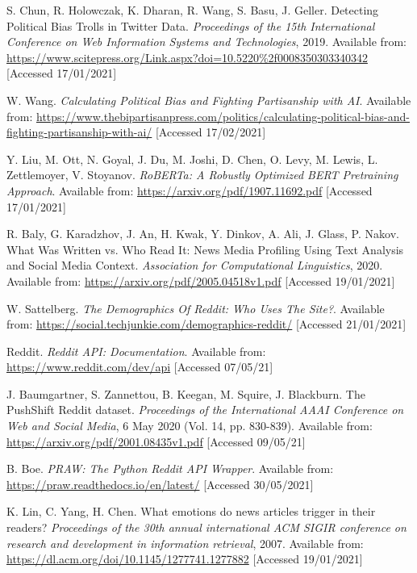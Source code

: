 \begin{thebibliography}{9}
S. Chun, R. Holowczak, K. Dharan, R. Wang, S. Basu, J. Geller. Detecting Political Bias Trolls in Twitter Data. \textit{Proceedings of the 15th International Conference on Web Information Systems and Technologies}, 2019. Available from: \url{https://www.scitepress.org/Link.aspx?doi=10.5220\%2f0008350303340342} [Accessed 17/01/2021]

W. Wang. \textit{Calculating Political Bias and Fighting Partisanship with AI}. Available from: \url{https://www.thebipartisanpress.com/politics/calculating-political-bias-and-fighting-partisanship-with-ai/} [Accessed 17/02/2021]

Y. Liu, M. Ott, N. Goyal, J. Du, M. Joshi, D. Chen, O. Levy, M. Lewis, L. Zettlemoyer, V. Stoyanov. \textit{RoBERTa: A Robustly Optimized BERT Pretraining Approach}. Available from: \url{https://arxiv.org/pdf/1907.11692.pdf} [Accessed 17/01/2021]

R. Baly, G. Karadzhov, J. An, H. Kwak, Y. Dinkov, A. Ali, J. Glass, P. Nakov. What Was Written vs. Who Read It:
News Media Profiling Using Text Analysis and Social Media Context. \textit{Association for Computational Linguistics}, 2020. Available from: \url{https://arxiv.org/pdf/2005.04518v1.pdf} [Accessed 19/01/2021]

W. Sattelberg. \textit{The Demographics Of Reddit: Who Uses The Site?}. Available from: \url{https://social.techjunkie.com/demographics-reddit/} [Accessed 21/01/2021]

Reddit. \textit{Reddit API: Documentation}. Available from: \url{https://www.reddit.com/dev/api} [Accessed 07/05/21]

J. Baumgartner, S. Zannettou, B. Keegan, M. Squire, J. Blackburn. The PushShift Reddit dataset. \textit{Proceedings of the International AAAI Conference on Web and Social Media}, 6 May 2020 (Vol. 14, pp. 830-839). Available from: \url{https://arxiv.org/pdf/2001.08435v1.pdf} [Accessed 09/05/21]

B. Boe. \textit{PRAW: The Python Reddit API Wrapper}. Available from: \url{https://praw.readthedocs.io/en/latest/} [Accessed 30/05/2021]

K. Lin, C. Yang, H. Chen. What emotions do news articles trigger in their readers? \textit{Proceedings of the 30th annual international ACM SIGIR conference on research and development in information retrieval}, 2007. Available from: \url{https://dl.acm.org/doi/10.1145/1277741.1277882} [Accessed 19/01/2021]


\end{thebibliography}
